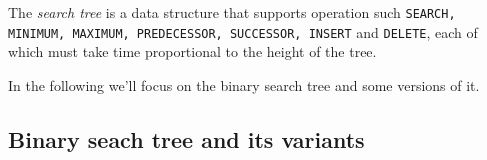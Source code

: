 \documentclass{subfiles}
\begin{document}
    The \emph{search tree} is a data structure that supports operation such
    \lstinline{SEARCH, MINIMUM, MAXIMUM, PREDECESSOR, SUCCESSOR, INSERT} and
    \lstinline{DELETE}, each of which must take time proportional to the height of the tree.

    In the following we'll focus on the binary search tree and some versions of it.
    
    \subsection{Binary seach tree and its variants}
    
\end{document}
